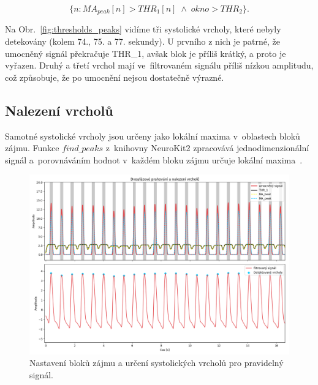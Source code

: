 \begin{equation}
	\{n : MA_{peak}[n] > THR_1[n] \; \land \; okno > THR_2\}.
	\label{eq:blocks}
\end{equation}

Na Obr.~\ref{fig:thresholds_peaks} vidíme tři systolické vrcholy, které nebyly detekovány (kolem 74., 75. a 77. sekundy).
U prvního z nich je patrné, že umocněný signál překračuje \acs{THR_1}, avšak blok je příliš krátký, a proto je vyřazen.
Druhý a třetí vrchol mají ve~filtrovaném signálu příliš nízkou amplitudu, což způsobuje, že po umocnění nejsou dostatečně výrazné.

\subsection*{Nalezení vrcholů}
\label{sec:peaks}

Samotné systolické vrcholy jsou určeny jako lokální maxima v~oblastech bloků zájmu.
Funkce \(find\_peaks\) z~knihovny NeuroKit2 zpracovává jednodimenzionální signál a~porovnáváním hodnot v~každém bloku zájmu určuje lokální maxima~\cite{NeuroKit2}.

\begin{figure}[t]
	\vspace{-9mm}
	\centering
	\includegraphics[width=1\textwidth]{./obrazky/Elgendi_THR_Peaks_Clean.png}
	\vspace{-10mm}
	\caption[Elgendiho zpracování pravidelného signálu]{Nastavení bloků zájmu a určení systolických vrcholů pro pravidelný signál.}
	\label{fig:thresholds_peaks_clean}
\end{figure}

